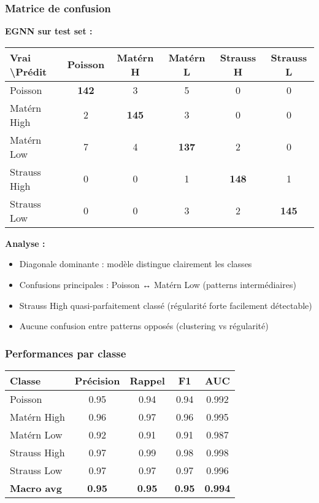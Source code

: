 \subsubsection{Matrice de confusion}

\textbf{EGNN sur test set :}

\begin{center}
\begin{tabular}{|l|c|c|c|c|c|}
\hline
\textbf{Vrai \textbackslash Prédit} & \textbf{Poisson} & \textbf{Matérn H} & \textbf{Matérn L} & \textbf{Strauss H} & \textbf{Strauss L} \\
\hline
Poisson & \textbf{142} & 3 & 5 & 0 & 0 \\
Matérn High & 2 & \textbf{145} & 3 & 0 & 0 \\
Matérn Low & 7 & 4 & \textbf{137} & 2 & 0 \\
Strauss High & 0 & 0 & 1 & \textbf{148} & 1 \\
Strauss Low & 0 & 0 & 3 & 2 & \textbf{145} \\
\hline
\end{tabular}
\end{center}

\textbf{Analyse :}
\begin{itemize}
    \item Diagonale dominante : modèle distingue clairement les classes
    \item Confusions principales : Poisson ↔ Matérn Low (patterns intermédiaires)
    \item Strauss High quasi-parfaitement classé (régularité forte facilement détectable)
    \item Aucune confusion entre patterns opposés (clustering vs régularité)
\end{itemize}

\subsubsection{Performances par classe}

\begin{center}
\begin{tabular}{|l|c|c|c|c|}
\hline
\textbf{Classe} & \textbf{Précision} & \textbf{Rappel} & \textbf{F1} & \textbf{AUC} \\
\hline
Poisson & 0.95 & 0.94 & 0.94 & 0.992 \\
Matérn High & 0.96 & 0.97 & 0.96 & 0.995 \\
Matérn Low & 0.92 & 0.91 & 0.91 & 0.987 \\
Strauss High & 0.97 & 0.99 & 0.98 & 0.998 \\
Strauss Low & 0.97 & 0.97 & 0.97 & 0.996 \\
\hline
\textbf{Macro avg} & \textbf{0.95} & \textbf{0.95} & \textbf{0.95} & \textbf{0.994} \\
\hline
\end{tabular}
\end{center}

